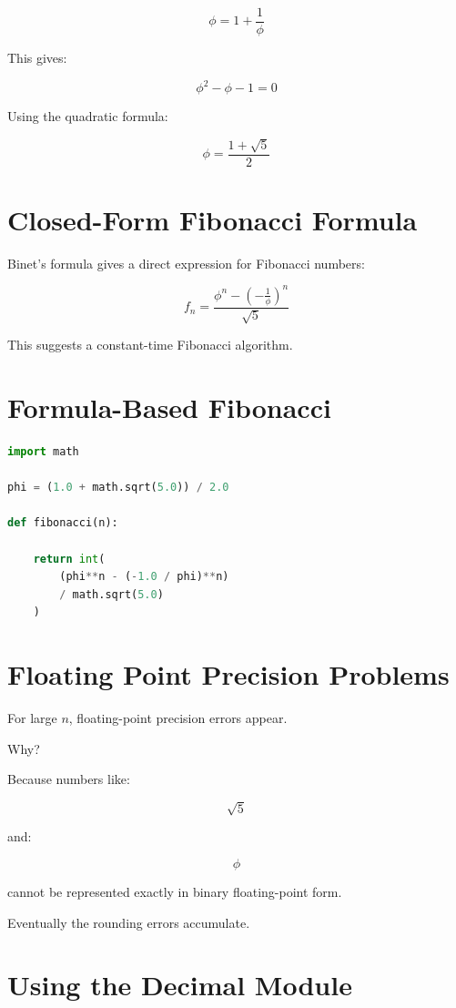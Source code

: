 \documentclass[11pt]{article}
\begin{document}
\[
\phi = 1 + \frac{1}{\phi}
\]

This gives:

\[
\phi^2 - \phi - 1 = 0
\]

Using the quadratic formula:

\[
\phi =
\frac{1 + \sqrt{5}}{2}
\]

\section{Closed-Form Fibonacci Formula}

Binet's formula gives a direct expression for Fibonacci numbers:

\[
f_n =
\frac{
\phi^n -
\left(-\frac{1}{\phi}\right)^n
}{
\sqrt{5}
}
\]

This suggests a constant-time Fibonacci algorithm.

\section{Formula-Based Fibonacci}

\begin{lstlisting}[language=Python]
import math

phi = (1.0 + math.sqrt(5.0)) / 2.0

def fibonacci(n):

    return int(
        (phi**n - (-1.0 / phi)**n)
        / math.sqrt(5.0)
    )
\end{lstlisting}

\section{Floating Point Precision Problems}

For large \(n\), floating-point precision errors appear.

Why?

Because numbers like:

\[
\sqrt{5}
\]

and:

\[
\phi
\]

cannot be represented exactly in binary floating-point form.

Eventually the rounding errors accumulate.

\section{Using the Decimal Module}
\end{document}
